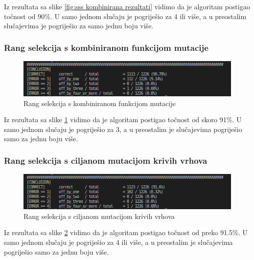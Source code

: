 \documentclass[times, utf8, zavrsni, numeric]{fer}
\begin{document}
Iz rezultata sa slike \ref{fig:sss kombinirana rezultati} vidimo da je algoritam postigao točnost od 90\%. U samo jednom slučaju je pogriješio za 4 ili više, a u preostalim slučajevima je pogriješio za samo jednu boju više.

\subsubsection{Rang selekcija s kombiniranom funkcijom mutacije}

\begin{figure}[h]
\centering
\includegraphics[width=14cm]{images/mutation_func_rank_selection_200_249.png}
\caption{Rang selekcija s kombiniranom funkcijom mutacije}
\label{fig:rank selekcija kombinirana rezultati}
\end{figure}

Iz rezultata sa slike \ref{fig:rank selekcija kombinirana rezultati} vidimo da je algoritam postigao točnost od skoro 91\%. U samo jednom slučaju je pogriješio za 3, a u preostalim je slučajevima pogriješio samo za jednu boju više.

\newpage
\subsubsection{Rang selekcija s ciljanom mutacijom krivih vrhova}

\begin{figure}[h]
\centering
\includegraphics[width=14cm]{images/targeted_change_on_bad_vertices_rank_selection_200_249.png}
\caption{Rang selekcija s ciljanom mutacijom krivih vrhova}
\label{fig:rank selekcija ciljana random rezultati}
\end{figure}

Iz rezultata sa slike \ref{fig:rank selekcija ciljana random rezultati}  vidimo da je algoritam postigao točnost od preko 91.5\%. U samo jednom slučaju je pogriješio za 4 ili više, a u preostalim je slučajevima pogriješio samo za jednu boju više.
\end{document}
